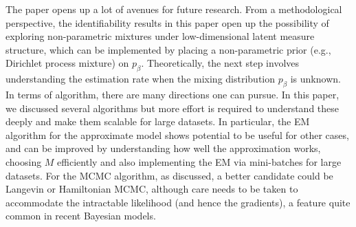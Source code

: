 \documentclass[bj,authoryear]{imsart}
\theoremstyle{plain}
\theoremstyle{remark}
\begin{document}
The paper opens up a lot of avenues for future research. From a methodological perspective, the identifiability results in this paper open up the possibility of exploring non-parametric mixtures under low-dimensional latent measure structure, which can be implemented by placing a non-parametric prior (e.g., Dirichlet process mixture) on $p_{\beta}$. Theoretically, the next step involves understanding the estimation rate when the mixing distribution $p_{\beta}$ is unknown. In terms of algorithm, there are many directions one can pursue. In this paper, we discussed several algorithms but more effort is required to understand these deeply and make them scalable for large datasets. In particular, the EM algorithm for the approximate model shows potential to be useful for other cases, and can be improved by understanding how well the approximation works, choosing $M$ efficiently and also implementing the EM via mini-batches for large datasets. For the MCMC algorithm, as discussed, a better candidate could be Langevin or Hamiltonian MCMC, although care needs to be taken to accommodate the intractable likelihood (and hence the gradients), a feature quite common in recent Bayesian models.

   
\end{document}
